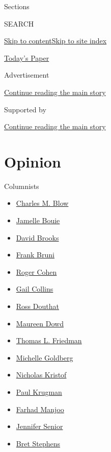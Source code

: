 Sections

SEARCH

\protect\hyperlink{site-content}{Skip to
content}\protect\hyperlink{site-index}{Skip to site index}

\href{https://myaccount.nytimes3xbfgragh.onion/auth/login?response_type=cookie\&client_id=vi}{}

\href{https://www.nytimes3xbfgragh.onion/section/todayspaper}{Today's
Paper}

Advertisement

\protect\hyperlink{after-top}{Continue reading the main story}

Supported by

\protect\hyperlink{after-sponsor}{Continue reading the main story}

\hypertarget{opinion}{%
\section{Opinion}\label{opinion}}

Columnists

\begin{itemize}
\tightlist
\item
  \href{/column/charles-m-blow}{Charles M. Blow}
\item
  \href{/column/jamelle-bouie}{Jamelle Bouie}
\item
  \href{/column/david-brooks}{David Brooks}
\item
  \href{/column/frank-bruni}{Frank Bruni}
\item
  \href{/column/roger-cohen}{Roger Cohen}
\item
  \href{/column/gail-collins}{Gail Collins}
\item
  \href{/column/ross-douthat}{Ross Douthat}
\item
  \href{/column/maureen-dowd}{Maureen Dowd}
\item
  \href{/column/thomas-l-friedman}{Thomas L. Friedman}
\item
  \href{/column/michelle-goldberg}{Michelle Goldberg}
\item
  \href{/column/nicholas-kristof}{Nicholas Kristof}
\item
  \href{/column/paul-krugman}{Paul Krugman}
\item
  \href{/column/farhad-manjoo}{Farhad Manjoo}
\item
  \href{/column/jennifer-senior}{Jennifer Senior}
\item
  \href{/column/bret-stephens}{Bret Stephens}
\end{itemize}

